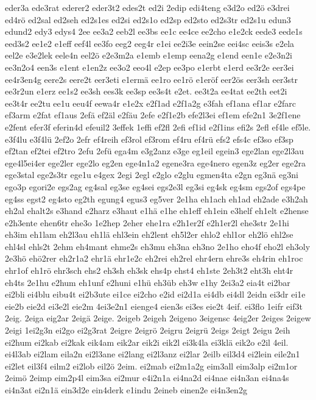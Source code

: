 {eder3a
ede3rat
ederer2
eder3t2
edes2t
ed2i
2edip
edi4teng
e3d2o
ed2ö
e3drei
ed4rö
ed2sal
ed2seh
ed2s1es
ed2si
ed2s1o
ed2sp
ed2sto
ed2s3tr
ed2s1u
edun3
edund2
edy3
edys4
2ee
ee3a2
eeb2l
ee3bs
ee1c
ee4ce
ee2cho
e1e2ck
eede3
eede1s
eed3s2
ee1e2
e1eff
eef4l
ee3fo
eeg2
eeg4r
e1ei
ee2i3e
eein2se
eei4sc
eeis3s
e2ela
eel2e
e3e2lek
eele4n
eel2ö
e2e3m2a
e1emb
e1emp
eena2g
e1end
een1e
e2e3n2i
ee3n2o4
een3s
e1ent
e1en2z
ee3o2
eeo4l
e2ep
ee3po
e1erbt
e1erd
ee3r2e
eer3ei
ee4r3en4g
eere2s
eere2t
eer3eti
e1ermä
ee1ro
ee1rö
e1eröf
eer2ös
eer3sh
eer3str
ee3r2un
e1erz
ee1s2
ee3sh
ees3k
ee3sp
ee3s4t
e2et.
ee3t2a
ee4tat
ee2th
eet2i
ee3t4r
ee2tu
ee1u
eeu4f
eewa4r
e1e2x
e2f1ad
e2f1a2g
e3fah
ef1ana
ef1ar
e2farc
ef3arm
e2fat
ef1aus
2efä
ef2äl
e2fäu
2efe
e2f1e2b
efe2l3ei
ef1em
efe2n1
3e2f1ene
e2fent
efer3f
eferin4d
efeuil2
3effek
1effi
ef2fl
2efi
ef1id
e2f1ins
efi2s
2efl
ef4le
ef5le.
e3f4lu
e3f4lü
2ef2o
2efr
ef4reih
ef3rol
ef3rom
ef4ru
ef4rü
efs2
efs4c
ef3so
ef3sp
ef2tan
ef2tei
ef2tro
2efu
2efü
ega4m
e3g2anz
e3ge
eg1eil
egein3
ege2lan
ege2l3au
ege4l5ei4er
ege2ler
ege2lo
eg2en
ege4n1a2
egene3ra
ege4nero
egen3z
eg2er
ege2ra
ege3stal
ege2s3tr
ege1u
e4gex
2egi
2egl
e2glo
e2glu
egmen4ta
e2gn
eg3nä
eg3ni
ego3p
egori2e
egs2ag
eg4sal
eg3se
eg4sei
egs2e3l
eg3si
eg4sk
eg4sm
egs2of
egs4pe
eg4ss
egst2
eg4sto
eg2th
egung4
egus3
eg5ver
2e1ha
eh1ach
eh1ad
eh2ade
e3h2ah
eh2al
ehalt2s
e3hand
e2harz
e3haut
e1hä
e1he
eh1eff
eh1ein
e3helf
eh1elt
e2hense
e2h3ente
ehen6tr
ehe3o
1e2hep
2eher
ehe1ra
e2h1er2f
e2h1er2l
ehe3str
2e1hi
eh3im
eh1lam
eh2l3au
eh1lä
ehl3ein
eh2lent
eh5l2er
ehlo2
ehl1or
eh2lö
ehl2se
ehl4sl
ehls2t
2ehm
eh4mant
ehme2s
eh3mu
eh3na
eh3no
2e1ho
eho4f
eho2l
eh3oly
2e3hö
ehö2rer
eh2r1a2
ehr1ä
ehr1e2c
eh2rei
eh2rel
ehr4ern
ehre3s
eh4rin
eh1roc
ehr1of
eh1rö
ehr3sch
ehs2
eh3sh
eh3sk
ehs4p
ehst4
eh1ste
2eh3t2
eht3h
eht4r
eh4ts
2e1hu
e2hum
eh1unf
e2huni
e1hü
eh3üb
eh3w
e1hy
2ei3a2
eia4t
ei2bar
ei2bli
ei4blu
eibu4t
ei2b3ute
ei1ce
ei2cho
e2id
ei2d1a
ei4db
ei4dl
2eidn
ei3dr
ei1e
eie2b
eie2d
ei3e2l
eie2m
4ei3e2n1
eienge4
eien3s
ei3es
eie2t
4eif.
ei3flo
1eifr
eif3t
2eig.
2eiga
eig2ar
2eigä
2eige.
2eigeb
2eigeh
2eigeno
3eigensc
4eig2er
2eiges
2eigew
2eigi
1ei2g3n
ei2go
ei2g3rat
2eigre
2eigrö
2eigru
2eigrü
2eigs
2eigt
2eigu
2eih
ei2hum
ei2kab
ei2kak
eik4am
eik2ar
eik2i
eik2l
ei3k4la
ei3klä
eik2o
e2il
4eil.
ei4l3ab
ei2lam
eila2n
ei2l3ane
ei2lang
ei2l3anz
ei2lar
2eilb
eil3d4
ei2lein
eile2n1
ei2let
eil3f4
eilm2
ei2lob
eil2ö
2eim.
ei2mab
ei2m1a2g
eim3all
eim3alp
ei2m1or
2eimö
2eimp
eim2p4l
eim3sa
ei2mur
e4i2n1a
ei4na2d
ei4nae
ei4n3an
ei4na4s
ei4n3at
ei2n1ä
ein3d2e
ein4derk
e1indu
2eineb
einen2e
ei4n3en2g
}
